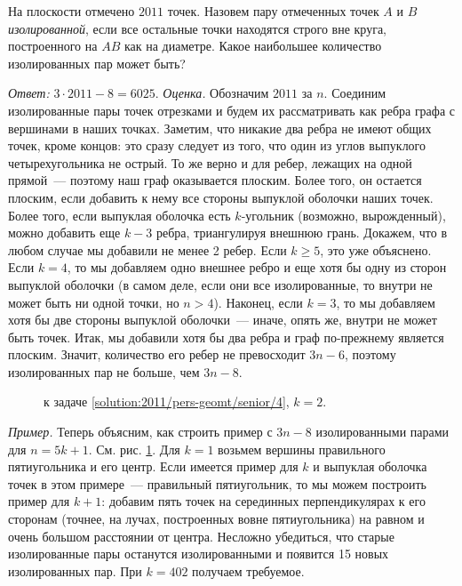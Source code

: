 На плоскости отмечено $2011$ точек.
Назовем пару отмеченных точек $A$ и $B$ \emph{изолированной}, если все остальные
точки находятся строго вне круга, построенного на $AB$ как на диаметре.
Какое наибольшее количество изолированных пар может быть?

\solution
\label{solution:2011/pers-geomt/senior/4}%
\emph{Ответ:}
$3 \cdot 2011 - 8 = 6025$.
\emph{Оценка.}
Обозначим $2011$ за $n$.
Соединим изолированные пары точек отрезками и будем их рассматривать как ребра
графа с вершинами в наших точках.
Заметим, что никакие два ребра не имеют общих точек, кроме концов:
это сразу следует из того, что один из углов выпуклого четырехугольника не
острый.
То же верно и для ребер, лежащих на одной прямой~--- поэтому наш граф
оказывается плоским.
Более того, он остается плоским, если добавить к нему все стороны выпуклой
оболочки наших точек.
Более того, если выпуклая оболочка есть $k$-угольник (возможно, вырожденный),
можно добавить еще $k - 3$ ребра, триангулируя внешнюю грань.
Докажем, что в любом случае мы добавили не менее 2 ребер.
Если $k \geq 5$, это уже объяснено.
Если $k = 4$, то мы добавляем одно внешнее ребро и еще хотя бы одну из сторон
выпуклой оболочки
(в самом деле, если они все изолированные, то внутри не может быть ни одной
точки, но $n > 4$).
Наконец, если $k = 3$, то мы добавляем хотя бы две стороны выпуклой
оболочки~--- иначе, опять же, внутри не может быть точек.
Итак, мы добавили хотя бы два ребра и граф по-прежнему является плоским.
Значит, количество его ребер не превосходит $3 n - 6$, поэтому изолированных
пар не больше, чем $3 n - 8$.
\par
\begin{figure}
\centering
\caption{к задаче \ref{solution:2011/pers-geomt/senior/4}, $k=2$.}
\label{fig:solution:2011/pers-geomt/senior/4}
\end{figure}%
\emph{Пример.}
Теперь объясним, как строить пример с $3 n - 8$ изолированными парами для
$n = 5 k + 1$.
См. рис. \ref{fig:solution:2011/pers-geomt/senior/4}.
Для $k = 1$ возьмем вершины правильного пятиугольника и его центр.
Если имеется пример для $k$ и выпуклая оболочка точек в этом примере~---
правильный пятиугольник, то мы можем построить пример для $k + 1$:
добавим пять точек на серединных перпендикулярах к его сторонам (точнее, на
лучах, построенных вовне пятиугольника) на равном и очень большом расстоянии от
центра.
Несложно убедиться, что старые изолированные пары останутся изолированными и
появится 15 новых изолированных пар.
При $k = 402$ получаем требуемое.

